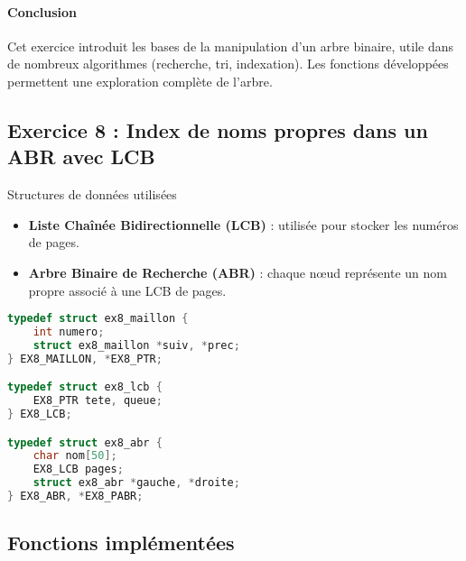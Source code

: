 \documentclass[a4paper,12pt]{article}
\begin{document}
\paragraph{Conclusion}

Cet exercice introduit les bases de la manipulation d’un arbre binaire, utile dans de nombreux algorithmes (recherche, tri, indexation). Les fonctions développées permettent une exploration complète de l’arbre.



\subsection{Exercice 8 : Index de noms propres dans un ABR avec LCB}

{Structures de données utilisées}

\begin{itemize}
    \item \textbf{Liste Chaînée Bidirectionnelle (LCB)} : utilisée pour stocker les numéros de pages.
    \item \textbf{Arbre Binaire de Recherche (ABR)} : chaque nœud représente un nom propre associé à une LCB de pages.
\end{itemize}

\begin{lstlisting}[language=C, caption={Structures utilisées}]
typedef struct ex8_maillon {
    int numero;
    struct ex8_maillon *suiv, *prec;
} EX8_MAILLON, *EX8_PTR;

typedef struct ex8_lcb {
    EX8_PTR tete, queue;
} EX8_LCB;

typedef struct ex8_abr {
    char nom[50];
    EX8_LCB pages;
    struct ex8_abr *gauche, *droite;
} EX8_ABR, *EX8_PABR;
\end{lstlisting}

\subsection*{Fonctions implémentées}
\end{document}
